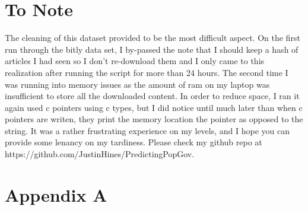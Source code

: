 \documentclass[11pt]{article}
\begin{document}
\section{To Note}
The cleaning of this dataset provided to be the most difficult aspect.  On the first run through the bitly data set, I by-passed the note that I should keep a hash of articles I had seen so I don't re-download them and I only came to this realization after running the script for more than 24 hours. The second time I was running into memory issues as the amount of ram on my laptop was insufficient to store all the downloaded content.  In order to reduce space, I ran it again used c pointers using c types, but I did notice until much later than when c pointers are writen, they print the memory location the pointer as opposed to the string. It was a rather frustrating experience on my levels, and I hope you can provide some lenancy on my tardiness.  Please check my github repo at https://github.com/JustinHines/PredictingPopGov.

\section{Appendix A}
\end{document}
